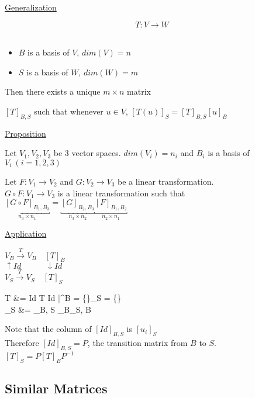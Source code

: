 \documentclass[12pt]{article}
\newenvironment{block}[1][Label]{\underline{#1}\par}{}
\newenvironment{proposition}{\block[Proposition]}{\endblock}
\newcommand{\uu}[1]{\underbracket{#1}}
\newcommand{\bb}[1]{\left\{#1\right\}}
\newcommand{\bbb}[1]{\left[#1\right]}
\newenvironment{eqn}{\equation\alignedat{3}}{\endalignedat\endequation}
\begin{document}
	\begin{block}[Generalization]
		$$T: V \rightarrow W$$ \\
		\begin{itemize}
			\item $B$ is a basis of $V$, $dim(V) = n$
			\item $S$ is a basis of $W$, $dim(W) = m$
		\end{itemize}
	
	Then there exists a unique $m \times n$ matrix
	
	$\bbb{T}_{B, S}$ such that whenever $u \in V$, $\bbb{T(u)}_S = \bbb{T}_{B, S} \bbb{u}_B$
	\end{block}
	
	\begin{proposition}
		Let $V_1, V_2, V_3$ be 3 vector spaces. $dim(V_i) = n_i$ and $B_i$ is a basis of $V_i \ (i = 1, 2, 3)$
		
		Let $F: V_1 \rightarrow V_2$ and $G: V_2 \rightarrow V_3$ be a linear transformation. \\ 
		$G \circ F: V_1 \rightarrow V_3$ is a linear transformation such that \\
		$\uu{\bbb{G \circ F}_{B_1, B_3}}_{n_3 \times n_1} = \uu{\bbb{G}_{B_2, B_3}}_{n_3 \times n_2} \uu{\bbb{F}_{B_1, B_2}}_{n_2 \times n_1}$
	\end{proposition}

	\pagebreak

	\begin{block}[Application]
		$V_B \xrightarrow{T} V_B \quad \bbb{T}_B$ \\
		$\uparrow Id \quad \quad \quad \downarrow Id$ \\
		$V_S \xrightarrow{T} V_S \quad \bbb{T}_S$
		
		\begin{eqn}
			T &= Id \circ T \circ Id \quad \big|^{B = \bb{\vv}}_{S = \bb{\vv[base=v]}} \\
			\bbb{T}_S &= \bbb{Id}_{B, S} \bbb{T}_B\bbb{Id}_{S, B}
		\end{eqn}
	
		Note that the column of $\bbb{Id}_{B, S}$ is $\bbb{u_i}_S$ \\
		Therefore $\bbb{Id}_{B, S} = P$, the transition matrix from $B$ to $S$. \\
		$\bbb{T}_S = P \bbb{T}_B P^{-1}$
	\end{block}
	
	\subsection{Similar Matrices}
	
\end{document}
